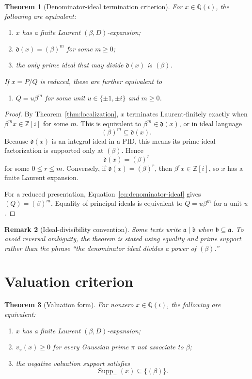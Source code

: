\documentclass[11pt]{article}
\newtheorem{theorem}{Theorem}[section]
\newtheorem{remark}[theorem]{Remark}
\theoremstyle{definition}
\newcommand{\Zi}{\mathbb{Z}[i]}
\newcommand{\Qi}{\mathbb{Q}(i)}
\newcommand{\supp}{\operatorname{Supp}}
\begin{document}
\begin{theorem}[Denominator-ideal termination criterion]
For $x\in\Qi$, the following are equivalent:
\begin{enumerate}[label=(\alph*)]
\item $x$ has a finite Laurent $(\beta,D)$-expansion;
\item $\mathfrak d(x)=(\beta)^m$ for some $m\ge0$;
\item the only prime ideal that may divide $\mathfrak d(x)$ is $(\beta)$.
\end{enumerate}
If $x=P/Q$ is reduced, these are further equivalent to
\begin{enumerate}[label=(\alph*),resume]
\item $Q=u\beta^m$ for some unit $u\in\{\pm1,\pm i\}$ and $m\ge0$.
\end{enumerate}
\label{thm:ideal-criterion}
\end{theorem}

\begin{proof}
By Theorem~\ref{thm:localization}, $x$ terminates Laurent-finitely exactly when $\beta^m x\in\Zi$ for some $m$.  This is equivalent to $\beta^m\in\mathfrak d(x)$, or in ideal language
\[
(\beta)^m\subseteq\mathfrak d(x).
\]
Because $\mathfrak d(x)$ is an integral ideal in a PID, this means its prime-ideal factorization is supported only at $(\beta)$.  Hence
\[
\mathfrak d(x)=(\beta)^r
\]
for some $0\le r\le m$.  Conversely, if $\mathfrak d(x)=(\beta)^r$, then $\beta^r x\in\Zi$, so $x$ has a finite Laurent expansion.

For a reduced presentation, Equation~\eqref{eq:denominator-ideal} gives $(Q)=(\beta)^m$.  Equality of principal ideals is equivalent to $Q=u\beta^m$ for a unit $u$.
\end{proof}

\begin{remark}[Ideal-divisibility convention]
Some texts write $\mathfrak a\mid\mathfrak b$ when $\mathfrak b\subseteq\mathfrak a$.  To avoid reversal ambiguity, the theorem is stated using equality and prime support rather than the phrase ``the denominator ideal divides a power of $(\beta)$.''
\end{remark}

\section{Valuation criterion}

\begin{theorem}[Valuation form]
For nonzero $x\in\Qi$, the following are equivalent:
\begin{enumerate}[label=(\alph*)]
\item $x$ has a finite Laurent $(\beta,D)$-expansion;
\item $v_\pi(x)\ge0$ for every Gaussian prime $\pi$ not associate to $\beta$;
\item the negative valuation support satisfies
\[
\supp_-(x)\subseteq\{(\beta)\}.
\]
\end{enumerate}
\label{thm:valuation}
\end{theorem}
\end{document}
